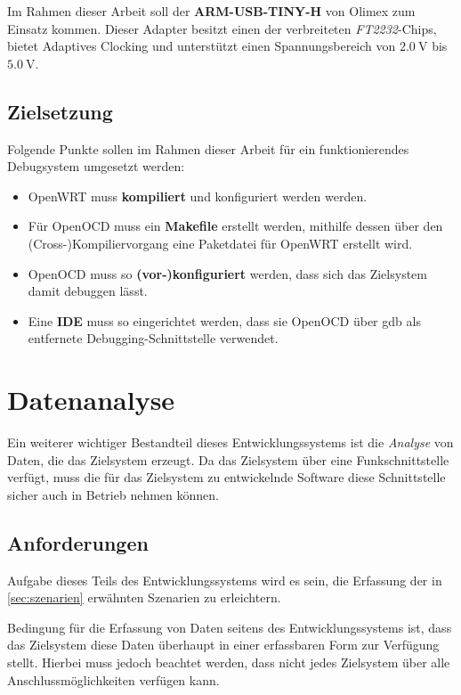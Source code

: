 Im Rahmen dieser Arbeit soll der \textbf{ARM-USB-TINY-H} von Olimex zum Einsatz
kommen.
Dieser Adapter besitzt einen der verbreiteten \emph{FT2232}-Chips, bietet
Adaptives Clocking und unterstützt einen Spannungsbereich von $\SI{2.0}{\volt}$
bis $\SI{5.0}{\volt}$.

\subsection{Zielsetzung}
\begin{minipage}[c]{\textwidth}
Folgende Punkte sollen im Rahmen dieser Arbeit für ein funktionierendes
Debugsystem umgesetzt werden:
\begin{itemize}
  \item OpenWRT muss \textbf{kompiliert} und konfiguriert werden werden.
  \item Für OpenOCD muss ein \textbf{Makefile} erstellt werden, mithilfe
  dessen über den \linebreak(Cross-)Kompiliervorgang eine Paketdatei für
  OpenWRT erstellt wird.
  \item OpenOCD muss so \textbf{(vor-)konfiguriert} werden, dass sich das
  Zielsystem damit debuggen lässt.
  \item Eine \textbf{IDE} muss so eingerichtet werden, dass sie OpenOCD über
  \gls{gdb} als entfernete Debugging-Schnittstelle verwendet.
\end{itemize}
\end{minipage}
\section{Datenanalyse}\label{sec:datenan}
Ein weiterer wichtiger Bestandteil dieses Entwicklungssystems ist die
\emph{Analyse} von Daten, die das Zielsystem erzeugt. Da das Zielsystem über
eine Funkschnittstelle verfügt, muss die für das Zielsystem zu entwickelnde
Software diese Schnittstelle sicher auch in Betrieb nehmen können.
\subsection{Anforderungen}
Aufgabe dieses Teils des Entwicklungssystems wird es sein, die Erfassung der in
\autoref{sec:szenarien} erwähnten Szenarien zu erleichtern.

Bedingung für die Erfassung von Daten seitens des Entwicklungssystems ist, dass
das Zielsystem diese Daten überhaupt in einer erfassbaren Form zur Verfügung
stellt. Hierbei muss jedoch beachtet werden, dass nicht jedes Zielsystem über
alle Anschlussmöglichkeiten verfügen kann.

